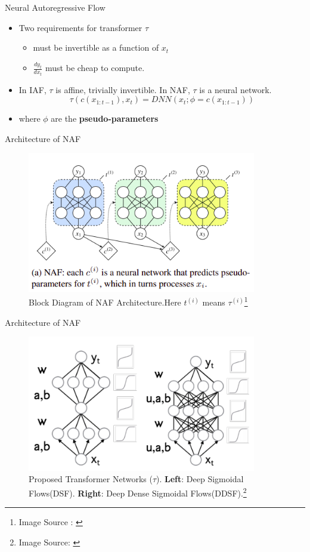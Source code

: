 \documentclass{beamer}
\begin{document}
\begin{frame}{Neural Autoregressive Flow}
    \begin{itemize}
        \item Two requirements for transformer $\tau$
        \begin{itemize}
            \item must be invertible as a function of $x_t$
            \item $\frac{dy_t}{dx_t}$ must be cheap to compute.
        \end{itemize}
        \item In IAF, $\tau$ is affine, trivially invertible. In NAF, $\tau$ is a neural network.
        \begin{equation}
            \tau(c(x_{1:t-1}),x_t) = DNN(x_t; \phi = c(x_{1:t-1}))
        \end{equation}
        \item where $\phi$ are the \textbf{pseudo-parameters}
    \end{itemize}
\end{frame}
\begin{frame}{Architecture of NAF}
\begin{figure}
    \centering
    \includegraphics[width=100mm,scale=0.7]{naf.png}
    \caption{Block Diagram of NAF Architecture.Here $t^{(i)}$ means $\tau^{(i)}$\footnote{Image Source : \cite{de2019block}}}
    \label{fig:naf}
\end{figure}
\end{frame}
\begin{frame}{Architecture of NAF}
\begin{figure}
    \centering
    \includegraphics[width=100mm,scale=0.7]{dsf-ddsf.png}
    \caption{Proposed Transformer Networks ($\tau$). \textbf{Left}: Deep Sigmoidal Flows(DSF). \textbf{Right}: Deep Dense Sigmoidal Flows(DDSF).\footnote{Image Source: \cite{huang2018neural}}}
    \label{fig:dsf-ddsf}
\end{figure}
\end{frame}
\end{document}
